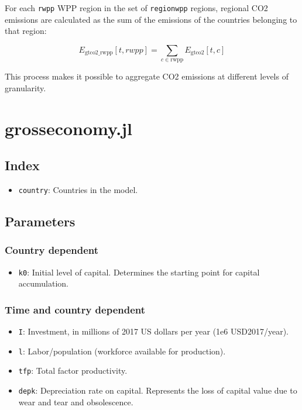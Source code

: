 \documentclass[
]{article}
\providecommand{\tightlist}{%
  \setlength{\itemsep}{0pt}\setlength{\parskip}{0pt}}
\begin{document}
For each \texttt{rwpp} WPP region in the set of \texttt{regionwpp}
regions, regional CO2 emissions are calculated as the sum of the
emissions of the countries belonging to that region:

\begin{equation}
 E_{\text{gtco2\_rwpp}}[t,rwpp] = \sum_{c \in \text{rwpp}} E_{\text{gtco2}}[t,c] 
\end{equation}


This process makes it possible to aggregate CO2 emissions at different
levels of granularity.

\section{grosseconomy.jl}\label{grosseconomy.jl}

\subsection{Index}\label{index}

\begin{itemize}
\tightlist
\item
  \texttt{country}: Countries in the model.
\end{itemize}

\subsection{Parameters}\label{parameters-3}

\subsubsection{Country dependent}\label{country-dependent-1}

\begin{itemize}
\tightlist
\item
  \texttt{k0}: Initial level of capital. Determines the starting point
  for capital accumulation.
\end{itemize}

\subsubsection{Time and country
dependent}\label{time-and-country-dependent-6}

\begin{itemize}
\item
  \texttt{I}: Investment, in millions of
  2017 US dollars per year (1e6 USD2017/year).
\item
  \texttt{l}: Labor/population (workforce available for production).
\item
  \texttt{tfp}: Total factor productivity.
\item
  \texttt{depk}: Depreciation rate on capital. Represents the loss of
  capital value due to wear and tear and obsolescence.
\end{itemize}
\end{document}
